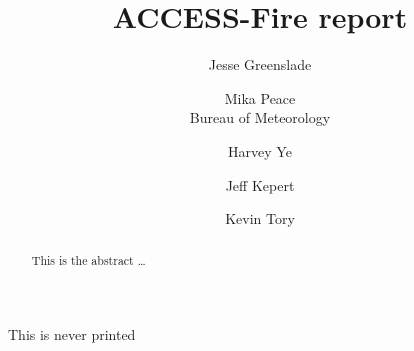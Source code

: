 \title{ACCESS-Fire report}

\author{
  Jesse Greenslade\\
  \and
  Mika Peace\\
  Bureau of Meteorology\\
  \and
  Harvey Ye\\
  \and
  Jeff Kepert\\
  \and
  Kevin Tory\\
}





\maketitle
\tableofcontents

\begin{abstract}
This is the abstract \ldots
\end{abstract}









  






This is never printed
